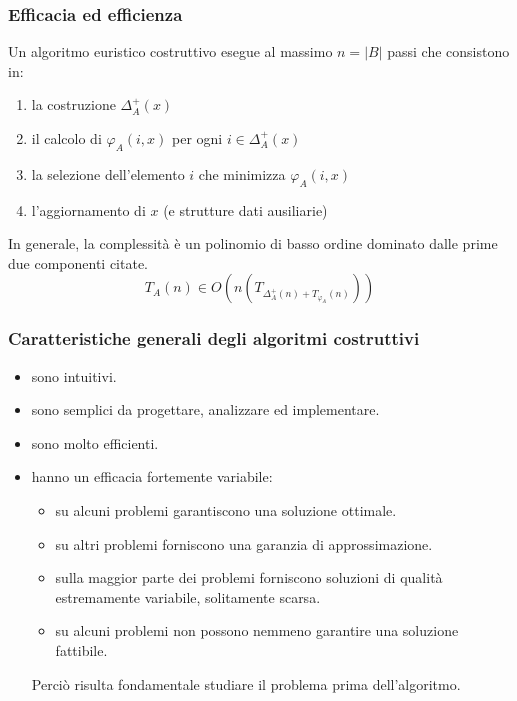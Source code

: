 \documentclass{article}
\begin{document}
    \subsubsection{Efficacia ed efficienza}
    Un algoritmo euristico costruttivo esegue al massimo $n=|B|$ passi che consistono in:
    \begin{enumerate}
        \item la costruzione $\Delta_A^+(x)$
        \item il calcolo di $\varphi_A(i,x)$ per ogni $i\in\Delta_A^+(x)$
        \item la selezione dell'elemento $i$ che minimizza $\varphi_A(i,x)$
        \item l'aggiornamento di $x$ (e strutture dati ausiliarie)
    \end{enumerate}
    In generale, la complessità è un polinomio di basso ordine dominato dalle prime due componenti citate.
    $$T_A(n)\in O\left(n(T_{\Delta_A^+(n)+T_{\varphi_A}(n)})\right)$$

    \subsubsection{Caratteristiche generali degli algoritmi costruttivi}
    \begin{itemize}
        \item sono intuitivi.
        \item sono semplici da progettare, analizzare ed implementare.
        \item sono molto efficienti.
        \item hanno un efficacia fortemente variabile:
              \begin{itemize}
                  \item su alcuni problemi garantiscono una soluzione ottimale.
                  \item su altri problemi forniscono una garanzia di approssimazione.
                  \item sulla maggior parte dei problemi forniscono soluzioni di qualità estremamente variabile,
                        solitamente scarsa.
                  \item su alcuni problemi non possono nemmeno garantire una soluzione fattibile.
              \end{itemize}
              Perciò risulta fondamentale studiare il problema prima dell'algoritmo.
    \end{itemize}
\end{document}
